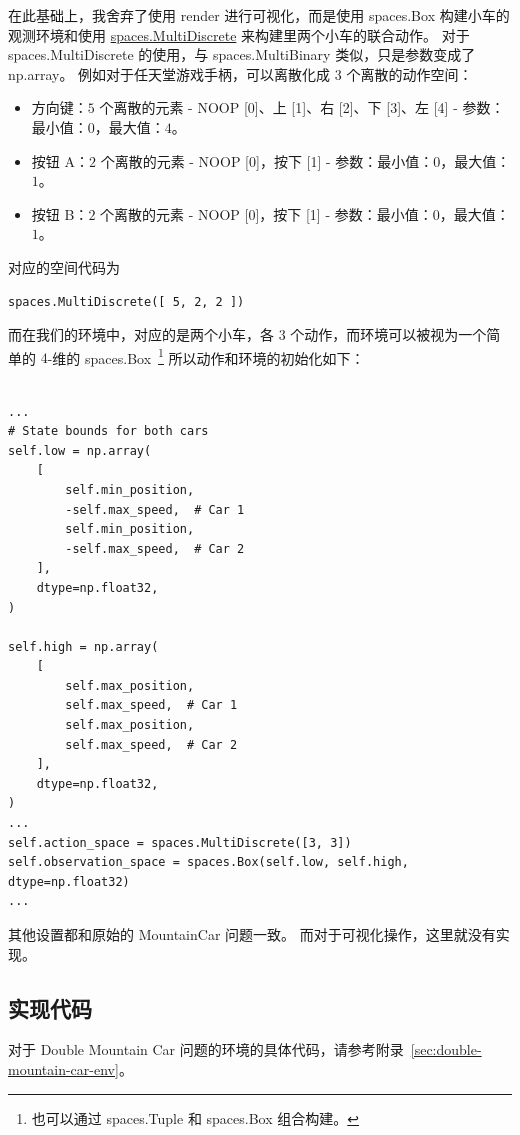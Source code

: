 \documentclass[citestyle=gb7714-2015, bibstyle=gb7714-2015,lang=cn,14pt,scheme=chinese]{elegantbook}
\begin{document}
在此基础上，我舍弃了使用 \textsf{render} 进行可视化，而是使用 \textsf{spaces.Box} 构建小车的观测环境和使用 \href{https://gymnasium.farama.org/api/spaces/fundamental/#gymnasium.spaces.MultiDiscrete}{\textsf{spaces.MultiDiscrete}} 来构建里两个小车的联合动作。
对于 \textsf{spaces.MultiDiscrete} 的使用，与 \textsf{spaces.MultiBinary} 类似，只是参数变成了 \textsf{np.array}。
例如对于任天堂游戏手柄，可以离散化成 \(3\) 个离散的动作空间：
\begin{itemize}
    \item 方向键：\(5\) 个离散的元素 - NOOP [0]、上 [1]、右 [2]、下 [3]、左 [4] - 参数：最小值：\(0\)，最大值：\(4\)。
    \item 按钮 A：\(2\) 个离散的元素 - NOOP [0]，按下 [1] - 参数：最小值：\(0\)，最大值：\(1\)。
    \item 按钮 B：\(2\) 个离散的元素 - NOOP [0]，按下 [1] - 参数：最小值：\(0\)，最大值：\(1\)。
\end{itemize}
对应的空间代码为
\begin{verbatim}
spaces.MultiDiscrete([ 5, 2, 2 ])
\end{verbatim}


而在我们的环境中，对应的是两个小车，各 \(3\) 个动作，而环境可以被视为一个简单的 \(4\)-维的 \textsf{spaces.Box}~\footnote{也可以通过 \textsf{spaces.Tuple} 和 \textsf{spaces.Box} 组合构建。} 所以动作和环境的初始化如下：
\begin{verbatim}

...
# State bounds for both cars
self.low = np.array(
    [
        self.min_position,
        -self.max_speed,  # Car 1
        self.min_position,
        -self.max_speed,  # Car 2
    ],
    dtype=np.float32,
)

self.high = np.array(
    [
        self.max_position,
        self.max_speed,  # Car 1
        self.max_position,
        self.max_speed,  # Car 2
    ],
    dtype=np.float32,
)
...
self.action_space = spaces.MultiDiscrete([3, 3])
self.observation_space = spaces.Box(self.low, self.high, dtype=np.float32)
...
\end{verbatim}
其他设置都和原始的 MountainCar 问题一致。
而对于可视化操作，这里就没有实现。

\subsection{实现代码}

对于 Double Mountain Car 问题的环境的具体代码，请参考附录~\ref{sec:double-mountain-car-env}。
\end{document}
